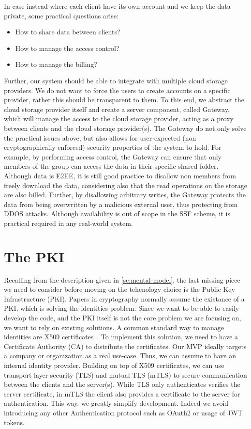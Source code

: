In case instead where each client have its own account
and we keep the data private,
some practical questions arise:
\begin{itemize}
    \item How to share data between clients?
    \item How to manage the access control?
    \item How to manage the billing?
\end{itemize}
Further, our system should be able to integrate with multiple
cloud storage providers. We do not want to force the users to
create accounts on a specific provider, rather this should be
transparent to them.
To this end, we abstract the cloud storage provider itself
and create a server component, called Gateway, which will manage
the access to the cloud storage provider, acting as a proxy
between clients and the cloud storage provider(s).
The Gateway do not only solve the practical issues above, but also
allows for user-expected (non cryptographically enforced) 
security properties of the system to hold.
For example, by performing access control, the Gateway can ensure
that only members of the group can access the data in their
specific shared folder. Although data is E2EE, it is still
good practice to disallow non members from freely download the data,
considering also that the read operations on the storage are also billed.
Further, by disallowing arbitrary writes, the Gateway
protects the data from being overwritten by a malicious external user,
thus protecting from DDOS attacks.
Although availability is out of scope in the SSF scheme,
it is practical required in any real-world system.

\section{The PKI}

Recalling from the description given in \cref{sc:mental-model},
the last missing piece we need to consider before moving
on the tehcnology choice is the Public Key Infrastructure (PKI).
Papers in cryptography normally assume the existance of a PKI,
which is solving the identities problem.
Since we want to be able to easily develop the code, and the PKI itself
is not the core problem we are focusing on, we want to rely on existing
solutions.
A common standard way to manage identities are X509 certificates~\cite{rfc5280}.
To implement this solution, we need to have a Certificate Authority (CA)
to distribute the certificates.
Our MVP ideally targets a company or organization as a real use-case. 
Thus, we can assume to have an internal identity provider.
Building on top of X509 certificates, we can use transport
layer security (TLS) and mutual TLS (mTLS) to 
secure communication between the clients and the server(s). 
While TLS only authenticates verifies the server certificate,
in mTLS the client also provides a certificate to the server
for authentication.
This way, we greatly simplify development. Indeed we 
avoid introducing any other Authentication
protocol such as OAuth2 or usage of JWT tokens.

